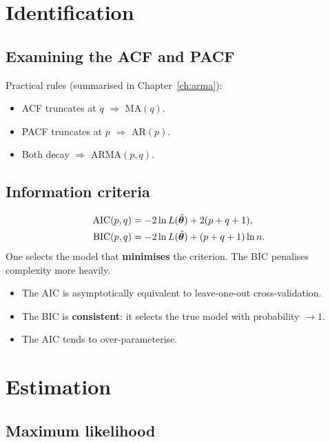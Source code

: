 \section{Identification}

\subsection{Examining the ACF and PACF}

Practical rules (summarised in Chapter~\ref{ch:arma}):
\begin{itemize}
\item ACF truncates at $q$ $\Rightarrow$ MA$(q)$.
\item PACF truncates at $p$ $\Rightarrow$ AR$(p)$.
\item Both decay $\Rightarrow$ ARMA$(p,q)$.
\end{itemize}

\subsection{Information criteria}

\begin{definition}
\begin{align}
\operatorname{AIC}(p,q) &= -2\ln L(\hat{\bm\theta}) + 2(p+q+1), \\
\operatorname{BIC}(p,q) &= -2\ln L(\hat{\bm\theta}) + (p+q+1)\ln n.
\end{align}
One selects the model that \textbf{minimises} the criterion. The BIC penalises complexity more heavily.
\end{definition}

\begin{theorem}
\begin{itemize}
\item The AIC is asymptotically equivalent to leave-one-out cross-validation.
\item The BIC is \textbf{consistent}: it selects the true model with probability $\to 1$.
\item The AIC tends to over-parameterise.
\end{itemize}
\end{theorem}

\section{Estimation}

\subsection{Maximum likelihood}

